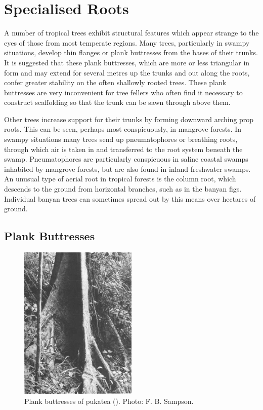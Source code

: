 \section{Specialised Roots}

A number of tropical trees exhibit structural features which appear strange to the eyes of those from most temperate regions.
Many trees, particularly in swampy situations, develop thin flanges or plank buttresses from the bases of their trunks.
It is suggested that these plank buttresses, which are more or less triangular in form and may extend for several metres up the trunks and out along the roots, confer greater stability on the often shallowly rooted trees.
These plank buttresses are very inconvenient for tree fellers who often find it necessary to construct scaffolding so that the trunk can be sawn through above them.

Other trees increase support for their trunks by forming downward arching prop roots.
This can be seen, perhaps most conspicuously, in mangrove forests.
In swampy situations many trees send up pneumatophores or breathing roots, through which air is taken in and transferred to the root system beneath the swamp.
Pneumatophores are particularly conspicuous in saline coastal swamps inhabited by mangrove forests, but are also found in inland freshwater swamps.
An unusual type of aerial root in tropical forests is the column root, which descends to the ground from horizontal branches, such as in the banyan figs.
Individual banyan trees can sometimes spread out by this means over hectares of ground.

\subsection{Plank Buttresses}

\begin{figure}
	\includegraphics[width=0.5\textwidth]{graphics/figure9buttresses.jpg}
	\centering
	\caption[Plank buttresses of pukatea]{Plank buttresses of pukatea ().
    Photo:  F. B. Sampson.}
	\label{fig:9buttresses}
\end{figure}

